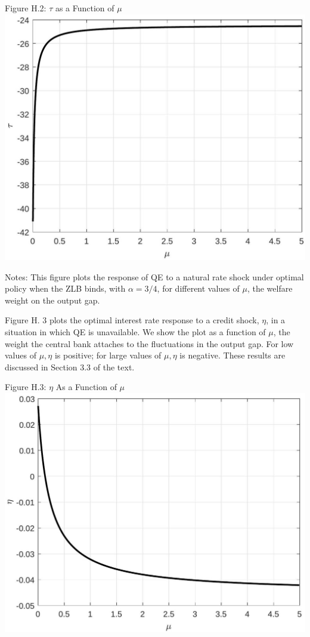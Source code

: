 \documentclass[10pt]{article}
\begin{document}
Figure H.2: $\tau$ as a Function of $\mu$\\
\includegraphics[max width=\textwidth, center]{2024_12_20_23d1456f4ac472ebd83dg-24}

Notes: This figure plots the response of QE to a natural rate shock under optimal policy when the ZLB binds, with $\alpha=3 / 4$, for different values of $\mu$, the welfare weight on the output gap.

Figure H. 3 plots the optimal interest rate response to a credit shock, $\eta$, in a situation in which QE is unavailable. We show the plot as a function of $\mu$, the weight the central bank attaches to the fluctuations in the output gap. For low values of $\mu, \eta$ is positive; for large values of $\mu, \eta$ is negative. These results are discussed in Section 3.3 of the text.

Figure H.3: $\eta$ As a Function of $\mu$\\
\includegraphics[max width=\textwidth, center]{2024_12_20_23d1456f4ac472ebd83dg-25}
\end{document}
